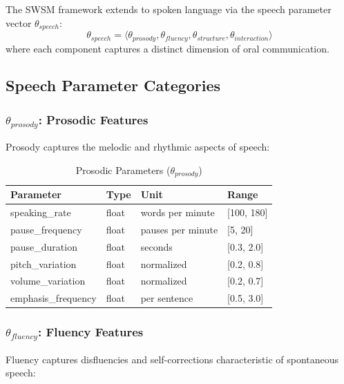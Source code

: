 \begin{axiom}
\label{ax:swsm-21}
The SWSM framework extends to spoken language via the speech parameter vector $\theta_{speech}$:
\begin{equation}
\theta_{speech} = \langle \theta_{prosody}, \theta_{fluency}, \theta_{structure}, \theta_{interaction} \rangle
\end{equation}
where each component captures a distinct dimension of oral communication.
\end{axiom}

\subsection{Speech Parameter Categories}
\label{sec:sw-speech-categories}

\subsubsection{$\theta_{prosody}$: Prosodic Features}

Prosody captures the melodic and rhythmic aspects of speech:

\begin{table}[h]
\centering
\caption{Prosodic Parameters ($\theta_{prosody}$)}
\label{tab:sw-prosody}
\begin{tabular}{llll}
\toprule
\textbf{Parameter} & \textbf{Type} & \textbf{Unit} & \textbf{Range} \\
\midrule
speaking\_rate & float & words per minute & [100, 180] \\
pause\_frequency & float & pauses per minute & [5, 20] \\
pause\_duration & float & seconds & [0.3, 2.0] \\
pitch\_variation & float & normalized & [0.2, 0.8] \\
volume\_variation & float & normalized & [0.2, 0.7] \\
emphasis\_frequency & float & per sentence & [0.5, 3.0] \\
\bottomrule
\end{tabular}
\end{table}

\subsubsection{$\theta_{fluency}$: Fluency Features}

Fluency captures disfluencies and self-corrections characteristic of spontaneous speech:

